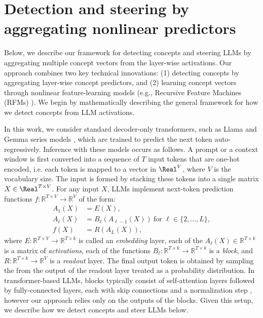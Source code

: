 \section{Detection and steering by aggregating nonlinear predictors}
\label{sec: techniques}

Below, we describe our framework for detecting concepts and steering LLMs by aggregating multiple concept vectors from the layer-wise activations. Our approach combines two key technical innovations: (1) detecting concepts by aggregating layer-wise concept predictors, and (2) learning concept vectors through  nonlinear feature-learning models (e.g., Recursive Feature Machines (RFMs) \citep{rfm_science}). We begin by mathematically describing the general framework for how we detect concepts from LLM activations.

In this work, we consider standard decoder-only transformers, such as Llama and Gemma series models \citep{brown2020language, llama, gemma}, which are trained to predict the next token auto-regressively. Inference with these models occurs as follows. A prompt or a context window is first converted into a sequence of $T$ input tokens that are one-hot encoded, i.e. each token is mapped to a vector in $\Real^V$, where $V$ is the vocabulary size. The input is formed by stacking these tokens into a single matrix $X \in \Real^{T \times V}$. For any input $X$, LLMs implement next-token prediction functions $f: \mathbb{R}^{T \times V} \to \mathbb{R}^{V}$ of the form: 
\begin{align*}
\label{eq: LLM forward pass}
    \tag{Embedding layer} A_1(X) &= E(X), \\
    \tag{Activations of the $\ell$-th block} A_{\ell}(X) &= B_{\ell}(A_{{\ell-1}}(X)) ~ \text{for $\ell \in \{2, \ldots, L\}$}, \\
    \tag{Final output} f(X) &= R(A_L(X)),
\end{align*}
where $E: \mathbb{R}^{T \times V} \to \mathbb{R}^{T \times k}$ is called an \textit{embedding} layer, each of the $A_{\ell}(X) \in \mathbb{R}^{T \times k}$ is a matrix of \textit{activations},  each of the functions $B_{\ell}: \mathbb{R}^{T \times k} \to \mathbb{R}^{T \times k}$ is a \textit{block}, and $R : \mathbb{R}^{T \times k} \rightarrow \mathbb{R}^{V}$ is a \textit{readout} layer. The final output token is obtained by sampling the from the output of the readout layer treated as a probability distribution. In transformer-based LLMs, blocks typically consist of self-attention layers followed by fully-connected layers, each with skip connections and a normalization step \citep{brown2020language}, however our approach relies only on the outputs of the blocks.  
 Given this setup, we describe how we detect concepts and steer LLMs below.  

